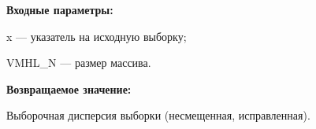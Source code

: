 \textbf{Входные параметры:}
 
x --- указатель на исходную выборку;
 
VMHL\_N --- размер массива.

\textbf{Возвращаемое значение:}
 
Выборочная дисперсия выборки (несмещенная, исправленная).